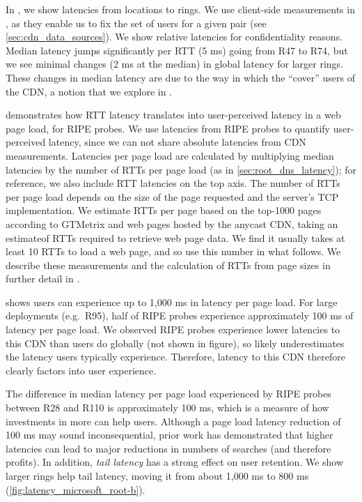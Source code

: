 \documentclass[sigconf,letterpaper,nonacm,10pt,anonymous]{acmart}
\begin{document}
In , we show latencies from
\metroas locations to rings. We use client-side measurements in
, as they enable us to fix the set of
users for a given \metroas pair (see \cref{sec:cdn_data_sources}). We
show relative latencies for confidentiality reasons. Median latency
jumps significantly per RTT (5 ms) going from R47 to R74, but we see
minimal changes (2 ms at the median) in global latency for larger rings.
These changes in median latency are due to the way in which the
\feplural ``cover'' users of the CDN, a notion that we explore in
.

 demonstrates how RTT latency
translates into user-perceived latency in a web page load, for RIPE
probes. We use latencies from RIPE probes to quantify user-perceived
latency, since we can not share absolute latencies from CDN
measurements. Latencies per page load are calculated by multiplying
median latencies by the number of RTTs per page load (as in
\cref{sec:root_dns_latency}); for reference, we also include RTT
latencies on the top axis. The number of RTTs per page load depends on
the size of the page requested and the server's TCP implementation. We
estimate RTTs per page based on the top-1000 pages according to GTMetrix
\cite{gtmetrix} and web pages hosted by the anycast CDN, taking an
estimateof RTTs required to retrieve web page data. We find it usually
takes at least 10 RTTs to load a web page, and so use this number in
what follows. We describe these measurements and the calculation of RTTs
from page sizes in further detail in .

 shows users can experience up to
1,000 ms in latency per page load. For large deployments (e.g.~R95),
half of RIPE probes experience approximately 100 ms of latency per page
load. We observed RIPE probes experience lower latencies to this CDN
than users do globally (not shown in figure), so
 likely underestimates the latency
users typically experience. Therefore, latency to this CDN therefore
clearly factors into user experience.

The difference in median latency per page load experienced by RIPE
probes between R28 and R110 is approximately 100 ms, which is a measure
of how investments in more \feplural can help users. Although a page
load latency reduction of 100 ms may sound inconsequential, prior work
has demonstrated that higher latencies can lead to major reductions in
numbers of searches \cite{brutlag2009speed} (and therefore profits). In
addition, \emph{tail latency} has a strong effect on user retention. We
show larger rings help tail latency, moving it from about 1,000 ms to
800 ms (\cref{fig:latency_microsoft_root-b}).
\end{document}
